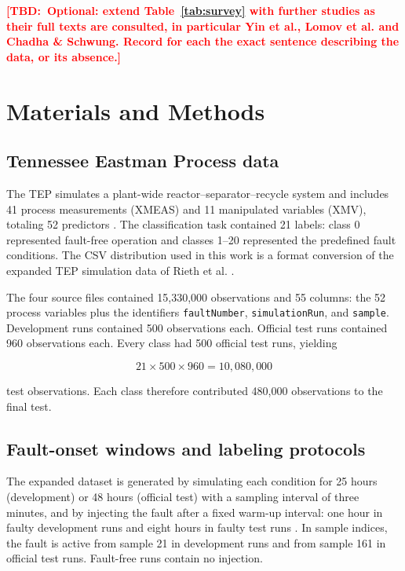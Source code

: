 \documentclass[12pt,a4paper]{article}
\newcommand{\TBD}[1]{\textcolor{red}{\textbf{[TBD:~#1]}}}
\begin{document}
\TBD{Optional: extend Table~\ref{tab:survey} with further studies as their full
texts are consulted, in particular Yin et al., Lomov et al. and Chadha \&
Schwung. Record for each the exact sentence describing the data, or its
absence.}

\section{Materials and Methods}

\subsection{Tennessee Eastman Process data}

The TEP simulates a plant-wide reactor--separator--recycle system and includes
41 process measurements (XMEAS) and 11 manipulated variables (XMV), totaling 52
predictors \cite{downs1993tep}. The classification task contained 21 labels:
class 0 represented fault-free operation and classes 1--20 represented the
predefined fault conditions. The CSV distribution used in this work is a format
conversion of the expanded TEP simulation data of Rieth et al.
\cite{rieth2017data,kaggleTEP}.

The four source files contained 15,330,000 observations and 55 columns: the 52
process variables plus the identifiers \texttt{faultNumber},
\texttt{simulationRun}, and \texttt{sample}. Development runs contained 500
observations each. Official test runs contained 960 observations each. Every
class had 500 official test runs, yielding

\begin{equation}
21\times 500\times 960=10{,}080{,}000
\end{equation}

test observations. Each class therefore contributed 480,000 observations to
the final test.

\subsection{Fault-onset windows and labeling protocols}
\label{sec:onset}

The expanded dataset is generated by simulating each condition for 25 hours
(development) or 48 hours (official test) with a sampling interval of three
minutes, and by injecting the fault after a fixed warm-up interval: one hour in
faulty development runs and eight hours in faulty test runs
\cite{rieth2017data,rieth2018issues,reinartz2021extended}. In sample indices,
the fault is active from sample 21 in development runs and from sample 161 in
official test runs. Fault-free runs contain no injection.
\end{document}
